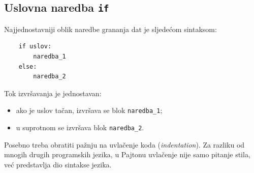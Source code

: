 \begin{table}[H]
	\caption{Osnovni operatori poređenja u Pajtonu.}
	\label{fig: operatori_poredjenja}
	
	\centering
	
\end{table}

\subsection{Uslovna naredba \texttt{if}}

Najjednostavniji oblik naredbe grananja dat je sljedećom sintaksom:

\begin{verbatim}
	if uslov:
	    naredba_1
	else:
	    naredba_2
\end{verbatim}

Tok izvršavanja je jednostavan:

\begin{itemize}
	\item ako je uslov tačan, izvršava se blok \texttt{naredba\_1};
	\item u suprotnom se izvršava blok \texttt{naredba\_2}.
\end{itemize}

Posebno treba obratiti pažnju na uvlačenje koda (\textit{indentation}). Za razliku od mnogih drugih programskih jezika, u Pajtonu uvlačenje nije samo pitanje stila, već predstavlja dio sintakse jezika.

